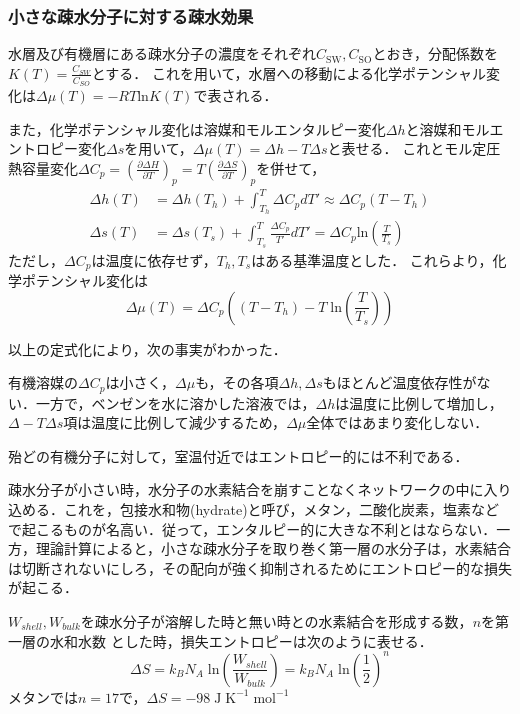 \documentclass[uplatex, dvipdfmx]{jsreport}
\begin{document}
\subsubsection{小さな疎水分子に対する疎水効果}

水層及び有機層にある疎水分子の濃度をそれぞれ$C_\mathrm{SW},C_\mathrm{SO}$とおき，分配係数を$K(T)=\frac{C_{SW}}{C_{SO}}$とする．
これを用いて，水層への移動による化学ポテンシャル変化は$\Delta\mu (T)=-RT\mathrm{ln}K(T)$で表される．

また，化学ポテンシャル変化は溶媒和モルエンタルピー変化$\Delta h$と溶媒和モルエントロピー変化$\Delta s$を用いて，$\Delta\mu(T)=\Delta h-T\Delta s$と表せる．
これとモル定圧熱容量変化$\Delta C_p=\left(\frac{\partial \Delta H}{\partial T}\right)_p=T\left(\frac{\partial \Delta S}{\partial T}\right)_p$を併せて，
\begin{align*}
    \Delta h(T) &= \Delta h(T_h)+\int^T_{T_h}\Delta C_pdT' \approx \Delta C_p (T-T_h) \\
    \Delta s(T) &= \Delta s(T_s)+\int^T_{T_s}\frac{\Delta C_p}{T'}dT' = \Delta C_p \mathrm{ln}\left( \frac{T}{T_s} \right)
\end{align*}
ただし，$\Delta C_p$は温度に依存せず，$T_h,T_s$はある基準温度とした．
これらより，化学ポテンシャル変化は
\[ \Delta\mu(T) = \Delta C_p\left( (T-T_h)-T\;\mathrm{ln}\left( \frac{T}{T_s} \right) \right) \]

以上の定式化により，次の事実がわかった．
\begin{fact}
    有機溶媒の$\Delta C_p$は小さく，$\Delta\mu$も，その各項$\Delta h,\Delta s$もほとんど温度依存性がない．一方で，ベンゼンを水に溶かした溶液では，$\Delta h$は温度に比例して増加し，$\Delta -T\Delta s$項は温度に比例して減少するため，$\Delta\mu$全体ではあまり変化しない．

    殆どの有機分子に対して，室温付近ではエントロピー的には不利である．
\end{fact}
\begin{explanation}[エントロピーとエンタルピーのトレードオフ]
    疎水分子が小さい時，水分子の水素結合を崩すことなくネットワークの中に入り込める．これを，包接水和物(hydrate)と呼び，メタン，二酸化炭素，塩素などで起こるものが名高い．従って，エンタルピー的に大きな不利とはならない．一方，理論計算によると，小さな疎水分子を取り巻く第一層の水分子は，水素結合は切断されないにしろ，その配向が強く抑制されるためにエントロピー的な損失が起こる．

    $W_{shell},W_{bulk}$を疎水分子が溶解した時と無い時との水素結合を形成する数，$n$を第一層の水和水数
    とした時，損失エントロピーは次のように表せる．
    \[ \Delta S=k_BN_A\;\mathrm{ln}\left( \frac{W_{shell}}{W_{bulk}} \right) = k_BN_A\;\mathrm{ln}\left(\frac{1}{2}\right)^n \]
    メタンでは$n=17$で，$\Delta S=-98\;\mathrm{J\;K^{-1}\;mol^{-1}}$
\end{explanation}
\end{document}
